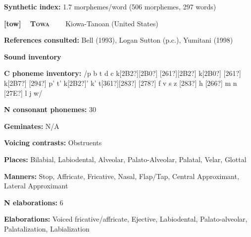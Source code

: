 \begin{styleBody}
\textbf{Synthetic index: }1.7 morphemes/word (506 morphemes, 297 words)
\end{styleBody}

\clearpage\begin{styleBody}
\textbf{[tow] }\ \ \textbf{\textsc{Towa\ \ }}\textbf{\ \ }Kiowa-Tanoan (United States)
\end{styleBody}

\begin{styleBody}
\textbf{References consulted: }Bell (1993), Logan Sutton (p.c.), Yumitani (1998)
\end{styleBody}

\begin{styleBody}
\textbf{Sound inventory}
\end{styleBody}

\begin{styleBody}
\textbf{C phoneme inventory:} /p b t d c k[2B2?][2B0?] [261?][2B2?] k[2B0?] [261?] k[2B7?] [294?] p’ t’ k[2B2?]’ k’ t[361?][283?] [278?] f v s z [283?] h [266?] m n [27E?] l j w/
\end{styleBody}

\begin{styleBody}
\textbf{N consonant phonemes:} 30
\end{styleBody}

\begin{styleBody}
\textbf{Geminates:} N/A
\end{styleBody}

\begin{styleBody}
\textbf{Voicing contrasts:} Obstruents
\end{styleBody}

\begin{styleBody}
\textbf{Places:} Bilabial, Labiodental, Alveolar, Palato-Alveolar, Palatal, Velar, Glottal
\end{styleBody}

\begin{styleBody}
\textbf{Manners:} Stop, Affricate, Fricative, Nasal, Flap/Tap, Central Approximant, Lateral Approximant
\end{styleBody}

\begin{styleBody}
\textbf{N elaborations:} 6
\end{styleBody}

\begin{styleBody}
\textbf{Elaborations:} Voiced fricative/affricate, Ejective, Labiodental, Palato-alveolar, Palatalization, Labialization
\end{styleBody}

